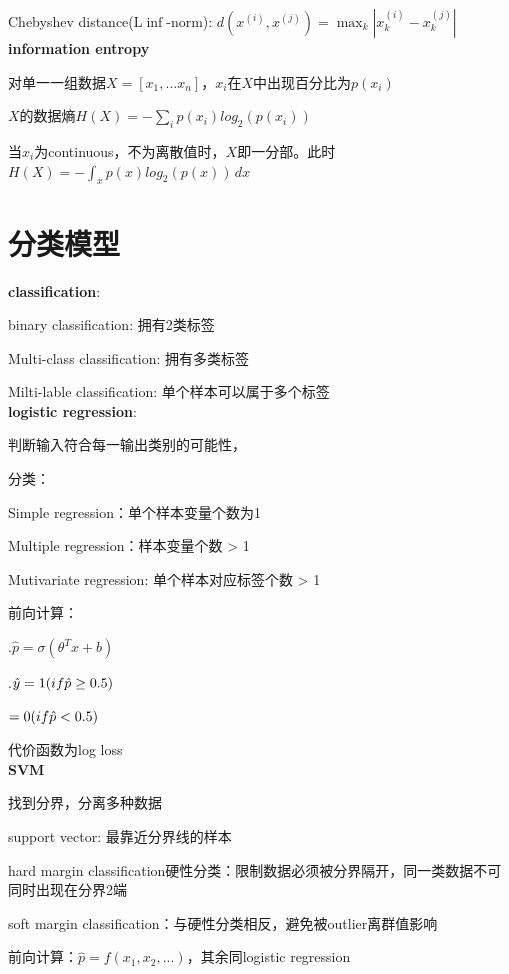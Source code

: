 \documentclass[UTF8]{ctexart}
\begin{document}
  Chebyshev distance(L$\inf$-norm): $d(x^{(i)}, x^{(j)}) = \max_k |x^{(i)}_k - x^{(j)}_k|$\\
\textbf{information entropy}

  对单一一组数据$X = [x_1, ... x_n]$，$x_i$在$X$中出现百分比为$p(x_i)$
  
  $X$的数据熵$H(X) = -\sum_i p(x_i)log_2(p(x_i))$

  当$x_i$为continuous，不为离散值时，$X$即一分部。此时$H(X) = -\int_{x} p(x)log_2(p(x))\,dx $


\section{分类模型}
\noindent \textbf{classification}:

  binary classification: 拥有2类标签

  Multi-class classification: 拥有多类标签

  Milti-lable classification: 单个样本可以属于多个标签\\
\textbf{logistic regression}:

  判断输入符合每一输出类别的可能性，

  分类：

  \quad Simple regression：单个样本变量个数为1

  \quad Multiple regression：样本变量个数 > 1

  \quad Mutivariate regression: 单个样本对应标签个数 > 1

  前向计算：
  
  .$\hat{p} = \sigma(\theta^Tx + b)$

  .$\hat{y} = 1\space (if \hat{p} \geq 0.5)$

  \quad \quad \quad $= 0\space (if \hat{p} < 0.5)$

  代价函数为log loss\\
\textbf{SVM}

  找到分界，分离多种数据

  support vector: 最靠近分界线的样本

  hard margin classification硬性分类：限制数据必须被分界隔开，同一类数据不可同时出现在分界2端

  soft margin classification：与硬性分类相反，避免被outlier离群值影响

  前向计算：$\hat{p} = f(x_1, x_2,...)$，其余同logistic regression
\end{document}
